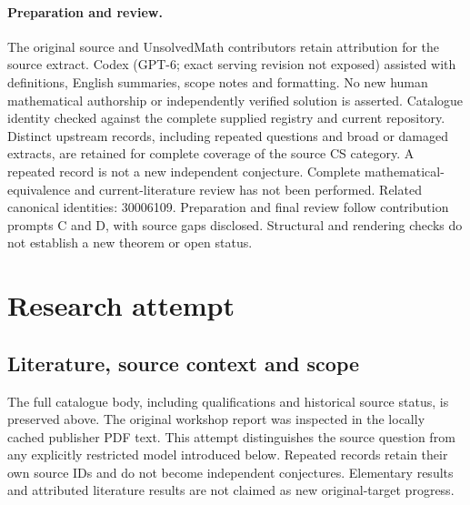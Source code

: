 \documentclass[11pt]{article}
\begin{document}
\paragraph{Preparation and review.}
The original source and UnsolvedMath contributors retain attribution for the source extract. Codex (GPT-6; exact serving revision not exposed) assisted with definitions, English summaries, scope notes and formatting. No new human mathematical authorship or independently verified solution is asserted. Catalogue identity checked against the complete supplied registry and current repository. Distinct upstream records, including repeated questions and broad or damaged extracts, are retained for complete coverage of the source CS category. A repeated record is not a new independent conjecture. Complete mathematical-equivalence and current-literature review has not been performed. Related canonical identities: 30006109. Preparation and final review follow contribution prompts C and D, with source gaps disclosed. Structural and rendering checks do not establish a new theorem or open status.
\label{end:statement}

\section{Research attempt}
\subsection{Literature, source context and scope}
The full catalogue body, including qualifications and historical source status, is preserved above. The original workshop report was inspected in the locally cached publisher PDF text. This attempt distinguishes the source question from any explicitly restricted model introduced below. Repeated records retain their own source IDs and do not become independent conjectures. Elementary results and attributed literature results are not claimed as new original-target progress.
\end{document}
